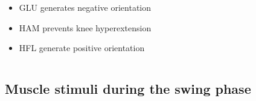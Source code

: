 \documentclass[10pt]{beamer}
\begin{document}
\begin{frame}
\begin{columns}
\begin{column}{.5\textwidth}
\begin{block}{}
\begin{equation*}
					\end{equation*}
				\end{block}		
				\begin{exampleblock}{}
					\begin{itemize}
						\item GLU generates negative orientation
						\item HAM prevents knee hyperextension	
						\item HFL generate positive orientation				
					\end{itemize}
				\end{exampleblock}
			\end{column}
		\end{columns}
	\end{frame}
	
	
	\subsection[Methodology]{Muscle stimuli during the swing phase}
\end{document}
